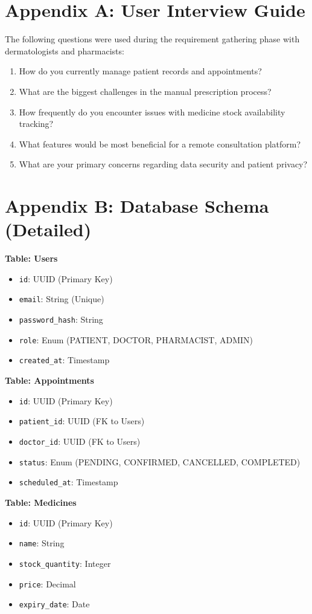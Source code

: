 \documentclass[12pt,a4paper]{report}
\begin{document}
\section{Appendix A: User Interview Guide}
The following questions were used during the requirement gathering phase with dermatologists and pharmacists:
\begin{enumerate}
    \item How do you currently manage patient records and appointments?
    \item What are the biggest challenges in the manual prescription process?
    \item How frequently do you encounter issues with medicine stock availability tracking?
    \item What features would be most beneficial for a remote consultation platform?
    \item What are your primary concerns regarding data security and patient privacy?
\end{enumerate}

\section{Appendix B: Database Schema (Detailed)}
\textbf{Table: Users}
\begin{itemize}
    \item \texttt{id}: UUID (Primary Key)
    \item \texttt{email}: String (Unique)
    \item \texttt{password\_hash}: String
    \item \texttt{role}: Enum (PATIENT, DOCTOR, PHARMACIST, ADMIN)
    \item \texttt{created\_at}: Timestamp
\end{itemize}

\textbf{Table: Appointments}
\begin{itemize}
    \item \texttt{id}: UUID (Primary Key)
    \item \texttt{patient\_id}: UUID (FK to Users)
    \item \texttt{doctor\_id}: UUID (FK to Users)
    \item \texttt{status}: Enum (PENDING, CONFIRMED, CANCELLED, COMPLETED)
    \item \texttt{scheduled\_at}: Timestamp
\end{itemize}

\textbf{Table: Medicines}
\begin{itemize}
    \item \texttt{id}: UUID (Primary Key)
    \item \texttt{name}: String
    \item \texttt{stock\_quantity}: Integer
    \item \texttt{price}: Decimal
    \item \texttt{expiry\_date}: Date
\end{itemize}
\end{document}

